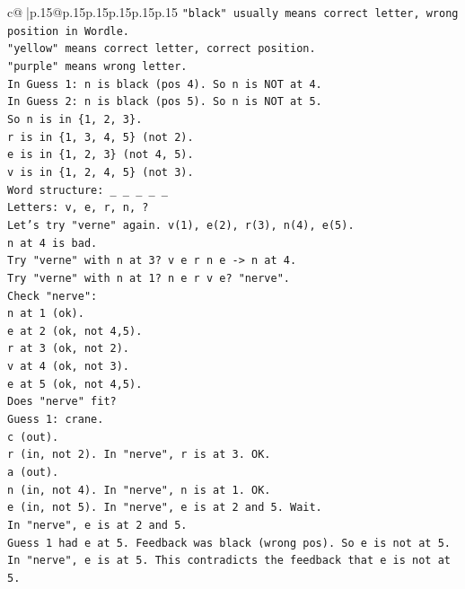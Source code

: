 \documentclass{article}
\begin{document}
{\begin{supertabular}{c@{$\;$}|p{.15\linewidth}@{}p{.15\linewidth}p{.15\linewidth}p{.15\linewidth}p{.15\linewidth}p{.15\linewidth}}
{{{\texttt{"black" usually means correct letter, wrong position in Wordle.} \\
\texttt{"yellow" means correct letter, correct position.} \\
\texttt{"purple" means wrong letter.} \\
\texttt{In Guess 1: n is black (pos 4). So n is NOT at 4.} \\
\texttt{In Guess 2: n is black (pos 5). So n is NOT at 5.} \\
\texttt{So n is in \{1, 2, 3\}.} \\
\texttt{r is in \{1, 3, 4, 5\} (not 2).} \\
\texttt{e is in \{1, 2, 3\} (not 4, 5).} \\
\texttt{v is in \{1, 2, 4, 5\} (not 3).} \\
\texttt{Word structure: \_ \_ \_ \_ \_} \\
\texttt{Letters: v, e, r, n, ?} \\
\texttt{Let's try "verne" again. v(1), e(2), r(3), n(4), e(5).} \\
\texttt{n at 4 is bad.} \\
\texttt{Try "verne" with n at 3? v e r n e {-}> n at 4.} \\
\texttt{Try "verne" with n at 1? n e r v e? "nerve".} \\
\texttt{Check "nerve":} \\
\texttt{n at 1 (ok).} \\
\texttt{e at 2 (ok, not 4,5).} \\
\texttt{r at 3 (ok, not 2).} \\
\texttt{v at 4 (ok, not 3).} \\
\texttt{e at 5 (ok, not 4,5).} \\
\texttt{Does "nerve" fit?} \\
\texttt{Guess 1: crane.} \\
\texttt{c (out).} \\
\texttt{r (in, not 2). In "nerve", r is at 3. OK.} \\
\texttt{a (out).} \\
\texttt{n (in, not 4). In "nerve", n is at 1. OK.} \\
\texttt{e (in, not 5). In "nerve", e is at 2 and 5. Wait.} \\
\texttt{In "nerve", e is at 2 and 5.} \\
\texttt{Guess 1 had e at 5. Feedback was black (wrong pos). So e is not at 5.} \\
\texttt{In "nerve", e is at 5. This contradicts the feedback that e is not at 5.} \\
}}}
\end{supertabular}}
\end{document}
